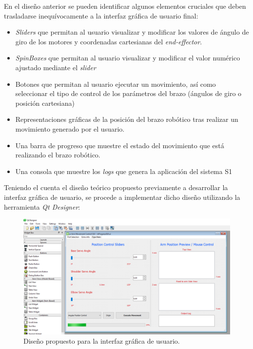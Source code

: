 En el diseño anterior se pueden identificar algunos elementos cruciales que deben trasladarse inequívocamente a la interfaz gráfica de usuario final:
\begin{itemize}
    \item \textit{Sliders} que permitan al usuario visualizar y modificar los valores de ángulo de giro de los motores y coordenadas cartesianas del \textit{end-effector}.
    
    \item \textit{SpinBoxes} que permitan al usuario visualizar y modificar el valor numérico ajustado mediante el \textit{slider} 
    
    \item Botones que permitan al usuario ejecutar un movimiento, así como seleccionar el tipo de control de los parámetros del brazo (ángulos de giro o posición cartesiana)
    
    \item Representaciones gráficas de la posición del brazo robótico tras realizar un movimiento generado por el usuario.
    
    \item Una barra de progreso que muestre el estado del movimiento que está realizando el brazo robótico.
    
    \item Una consola que muestre los \textit{logs} que genera la aplicación del sistema \ac{S1}
\end{itemize}

Teniendo el cuenta el diseño teórico propuesto previamente a desarrollar la interfaz gráfica de usuario, se procede a implementar dicho diseño utilizando la herramienta \textit{Qt Designer}:

\begin{figure}[H]
    \centering
    \includegraphics[width=0.8\linewidth]{pictures/DesignerGui.PNG}
    \caption{Diseño propuesto para la interfaz gráfica de usuario.}
    \label{fig:ui_QtDesigner}
\end{figure}







